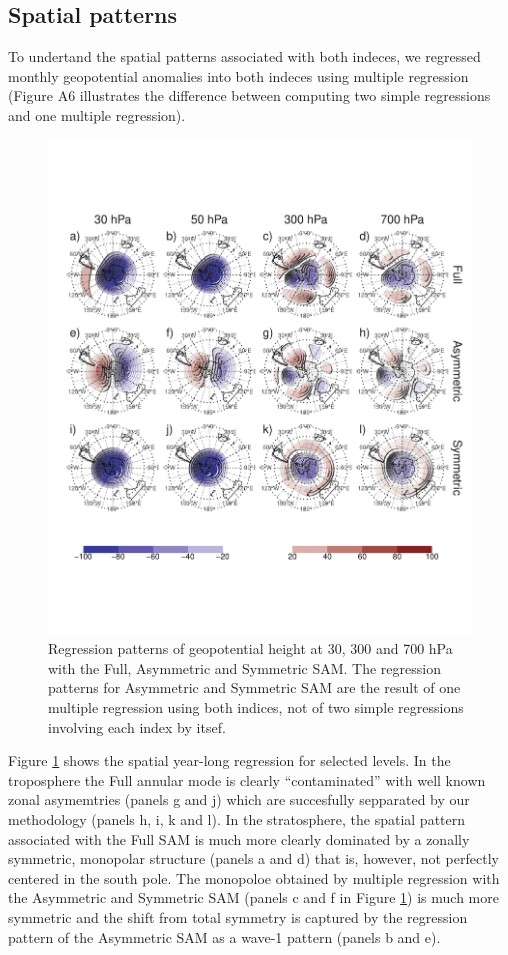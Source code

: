 \documentclass[]{ametsocV5}
\begin{document}
\subsection{Spatial patterns}

To undertand the spatial patterns associated with both indeces, we
regressed monthly geopotential anomalies into both indeces using
multiple regression (Figure A6 illustrates the difference between
computing two simple regressions and one multiple regression).

\begin{figure}
\includegraphics{2d-regr-1} \caption[Regression patterns of geopotential height at 30, 300 and 700 hPa with the Full, Asymmetric and Symmetric SAM]{Regression patterns of geopotential height at 30, 300 and 700 hPa with the Full, Asymmetric and Symmetric SAM. The regression patterns for Asymmetric and Symmetric SAM are the result of one multiple regression using both indices, not of two simple regressions involving each index by itsef.}\label{fig:2d-regr}
\end{figure}

Figure \ref{fig:2d-regr} shows the spatial year-long regression for
selected levels. In the troposphere the Full annular mode is clearly
``contaminated'' with well known zonal asymemtries (panels g and j)
which are succesfully sepparated by our methodology (panels h, i, k and
l). In the stratosphere, the spatial pattern associated with the Full
SAM is much more clearly dominated by a zonally symmetric, monopolar
structure (panels a and d) that is, however, not perfectly centered in
the south pole. The monopoloe obtained by multiple regression with the
Asymmetric and Symmetric SAM (panels c and f in Figure
\ref{fig:2d-regr}) is much more symmetric and the shift from total
symmetry is captured by the regression pattern of the Asymmetric SAM as
a wave-1 pattern (panels b and e).
\end{document}
